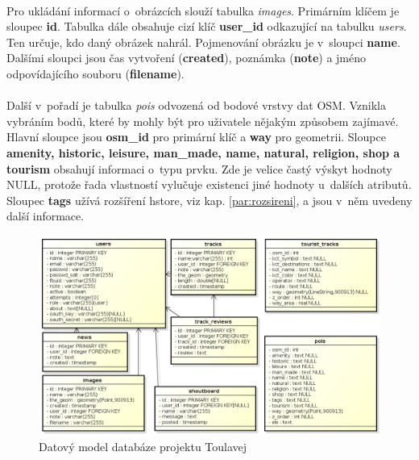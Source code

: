 \documentclass[11pt,a4paper,titlepage,oneside]{book}
\begin{document}
				\paragraph{}Pro ukládání informací o~obrázcích slouží tabulka \textit{images}. Primárním klíčem je sloupec \textbf{id}. Tabulka dále obsahuje cizí klíč \textbf{user\_id} odkazující na tabulku \textit{users}. Ten určuje, kdo daný obrázek nahrál. Pojmenování obrázku je v~sloupci \textbf{name}. Dalšími sloupci jsou čas vytvoření (\textbf{created}), poznámka (\textbf{note}) a jméno odpovídajícího souboru (\textbf{filename}).




				\paragraph{}Další v~pořadí je tabulka \textit{pois} odvozená od bodové vrstvy dat \ac{OSM}. Vznikla vybráním bodů, které by mohly být pro uživatele nějakým způsobem zajímavé. Hlavní sloupce jsou \textbf{osm\_id} pro primární klíč a \textbf{way} pro geometrii. Sloupce \textbf{amenity, historic, leisure, man\_made, name, natural, religion, shop a tourism} obsahují informaci o~typu prvku. Zde je velice častý výskyt hodnoty NULL, protože řada vlastností vylučuje existenci jiné hodnoty u~dalších atributů. Sloupec \textbf{tags} užívá rozšíření hstore, viz kap. \ref{par:rozsireni}, a jsou v~něm uvedeny další informace.
		\begin{figure}[!h]
			\begin{center}
				\includegraphics[width=13cm]{obrazky/datovy_model.png}
				\caption{Datový model databáze projektu Toulavej}
				\label{fig:db}
			\end{center}
		\end{figure}
\end{document}
